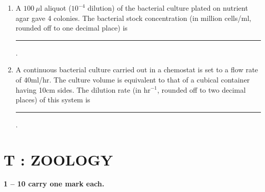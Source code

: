 \documentclass[journal,12pt,onecolumn]{IEEEtran}
\begin{document}
\begin{enumerate}[label=\arabic*.,resume]
\item A $100~\mu$l aliquot ($10^{-4}$ dilution) of the bacterial culture plated on nutrient agar gave 4 colonies. The bacterial stock concentration (in million cells/ml, rounded off to one decimal place) is \rule{2.5cm}{0.1pt}.

\item A continuous bacterial culture carried out in a chemostat is set to a flow rate of 40ml/hr. The culture volume is equivalent to that of a cubical container having 10cm sides. The dilution rate (in hr$^{-1}$, rounded off to two decimal places) of this system is \rule{2.5cm}{0.1pt}.

\end{enumerate}
\newpage
\section*{\centering T : ZOOLOGY}

\noindent \textbf{ 1 -- 10 carry one mark each.}
\end{document}
